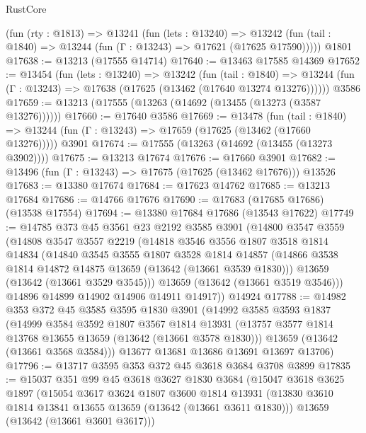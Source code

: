 \begin{lexlean}{RustCore}
\begin{coremodule}
    (fun (rty : @1813) =>
    @13241
      (fun (lets : @13240) =>
      @13242 (fun (tail : @1840) => @13244 (fun (Γ : @13243) => @17621 (@17625 @17590)))))
    @1801
@17638 := @13213 (@17555 @14714)
@17640 := @13463 @17585 @14369
@17652 := @13454
    (fun (lets : @13240) =>
    @13242
      (fun (tail : @1840) =>
      @13244 (fun (Γ : @13243) => @17638 (@17625 (@13462 (@17640 @13274 @13276))))))
    @3586
@17659 := @13213 (@17555 (@13263 (@14692 (@13455 (@13273 (@3587 @13276))))))
@17660 := @17640 @3586
@17669 := @13478
    (fun (tail : @1840) => @13244 (fun (Γ : @13243) => @17659 (@17625 (@13462 (@17660 @13276)))))
    @3901
@17674 := @17555 (@13263 (@14692 (@13455 (@13273 @3902))))
@17675 := @13213 @17674
@17676 := @17660 @3901
@17682 := @13496 (fun (Γ : @13243) => @17675 (@17625 (@13462 @17676))) @13526
@17683 := @13380 @17674
@17684 := @17623 @14762
@17685 := @13213 @17684
@17686 := @14766 @17676
@17690 := @17683 (@17685 @17686) (@13538 @17554)
@17694 := @13380 @17684 @17686 (@13543 @17622)
@17749 := @14785
    @373
    @45
    @3561
    @23
    @2192
    @3585
    @3901
    (@14800
      @3547
      @3559
      (@14808
        @3547
        @3557
        @2219
        (@14818
          @3546
          @3556
          @1807
          @3518
          @1814
          @14834
          (@14840
            @3545
            @3555
            @1807
            @3528
            @1814
            @14857
            (@14866 @3538 @1814 @14872 @14875 @13659 (@13642 (@13661 @3539 @1830)))
            @13659
            (@13642 (@13661 @3529 @3545)))
          @13659
          (@13642 (@13661 @3519 @3546)))
        @14896
        @14899
        @14902
        @14906
        @14911
        @14917))
    @14924
@17788 := @14982
    @353
    @372
    @45
    @3585
    @3595
    @1830
    @3901
    (@14992
      @3585
      @3593
      @1837
      (@14999
        @3584
        @3592
        @1807
        @3567
        @1814
        @13931
        (@13757 @3577 @1814 @13768 @13655 @13659 (@13642 (@13661 @3578 @1830)))
        @13659
        (@13642 (@13661 @3568 @3584)))
      @13677
      @13681
      @13686
      @13691
      @13697
      @13706)
@17796 := @13717 @3595 @353 @372 @45 @3618 @3684 @3708 @3899
@17835 := @15037
    @351
    @99
    @45
    @3618
    @3627
    @1830
    @3684
    (@15047
      @3618
      @3625
      @1897
      (@15054
        @3617
        @3624
        @1807
        @3600
        @1814
        @13931
        (@13830 @3610 @1814 @13841 @13655 @13659 (@13642 (@13661 @3611 @1830)))
        @13659
        (@13642 (@13661 @3601 @3617)))

\end{coremodule}
\end{lexlean}
